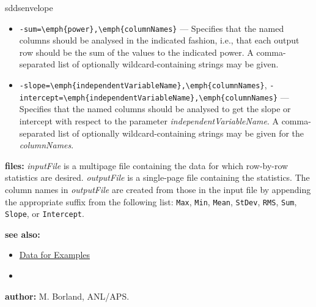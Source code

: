 \begin{sddsprog}{sddsenvelope}
\begin{itemize}
    \item \verb|-sum=\emph{power},\emph{columnNames}| --- Specifies that the named columns should be analysed in the indicated fashion, i.e., that each output row should be the sum of the values to the indicated power. A comma-separated list of optionally wildcard-containing strings may be given.
    \item \verb|-slope=\emph{independentVariableName},\emph{columnNames}|, \verb|-intercept=\emph{independentVariableName},\emph{columnNames}| --- Specifies that the named columns should be analysed to get the slope or intercept with respect to the parameter \emph{independentVariableName}. A comma-separated list of optionally wildcard-containing strings may be given for the \emph{columnNames}.
  \end{itemize}
  \item \textbf{files:} \emph{inputFile} is a multipage file containing the data for which row-by-row statistics are desired. \emph{outputFile} is a single-page file containing the statistics. The column names in \emph{outputFile} are created from those in the input file by appending the appropriate suffix from the following list: {\tt Max}, {\tt Min}, {\tt Mean}, {\tt StDev}, {\tt RMS}, {\tt Sum}, {\tt Slope}, or {\tt Intercept}.
  \item \textbf{see also:}
  \begin{itemize}
    \item \hyperref[exampleData]{Data for Examples}
    \item {}
  \end{itemize}
  \item \textbf{author:} M. Borland, ANL/APS.
\end{sddsprog}


